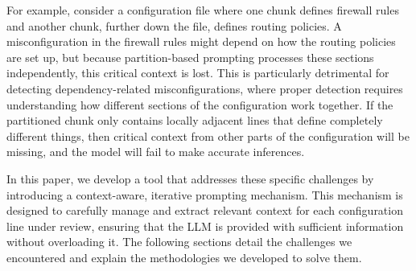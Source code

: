 For example, consider a configuration file where one chunk defines firewall rules and another chunk, further down the file, defines routing policies. A misconfiguration in the firewall rules might depend on how the routing policies are set up, but because partition-based prompting processes these sections independently, this critical context is lost. This is particularly detrimental for detecting dependency-related misconfigurations, where proper detection requires understanding how different sections of the configuration work together. If the partitioned chunk only contains locally adjacent lines that define completely different things, then critical context from other parts of the configuration will be missing, and the model will fail to make accurate inferences.

In this paper, we develop a tool that addresses these specific challenges by introducing a context-aware, iterative prompting mechanism. This mechanism is designed to carefully manage and extract relevant context for each configuration line under review, ensuring that the LLM is provided with sufficient information without overloading it. The following sections detail the challenges we encountered and explain the methodologies we developed to solve them.